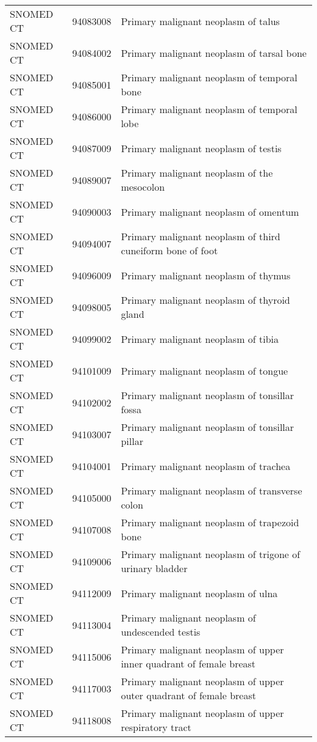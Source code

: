 \begin{longtable}{p{}p{}p{}}
  SNOMED CT & 94083008 & Primary malignant neoplasm of talus \\ 
  SNOMED CT & 94084002 & Primary malignant neoplasm of tarsal bone \\ 
  SNOMED CT & 94085001 & Primary malignant neoplasm of temporal bone \\ 
  SNOMED CT & 94086000 & Primary malignant neoplasm of temporal lobe \\ 
  SNOMED CT & 94087009 & Primary malignant neoplasm of testis \\ 
  SNOMED CT & 94089007 & Primary malignant neoplasm of the mesocolon \\ 
  SNOMED CT & 94090003 & Primary malignant neoplasm of omentum \\ 
  SNOMED CT & 94094007 & Primary malignant neoplasm of third cuneiform bone of foot \\ 
  SNOMED CT & 94096009 & Primary malignant neoplasm of thymus \\ 
  SNOMED CT & 94098005 & Primary malignant neoplasm of thyroid gland \\ 
  SNOMED CT & 94099002 & Primary malignant neoplasm of tibia \\ 
  SNOMED CT & 94101009 & Primary malignant neoplasm of tongue \\ 
  SNOMED CT & 94102002 & Primary malignant neoplasm of tonsillar fossa \\ 
  SNOMED CT & 94103007 & Primary malignant neoplasm of tonsillar pillar \\ 
  SNOMED CT & 94104001 & Primary malignant neoplasm of trachea \\ 
  SNOMED CT & 94105000 & Primary malignant neoplasm of transverse colon \\ 
  SNOMED CT & 94107008 & Primary malignant neoplasm of trapezoid bone \\ 
  SNOMED CT & 94109006 & Primary malignant neoplasm of trigone of urinary bladder \\ 
  SNOMED CT & 94112009 & Primary malignant neoplasm of ulna \\ 
  SNOMED CT & 94113004 & Primary malignant neoplasm of undescended testis \\ 
  SNOMED CT & 94115006 & Primary malignant neoplasm of upper inner quadrant of female breast \\ 
  SNOMED CT & 94117003 & Primary malignant neoplasm of upper outer quadrant of female breast \\ 
  SNOMED CT & 94118008 & Primary malignant neoplasm of upper respiratory tract \\ 

\end{longtable}
